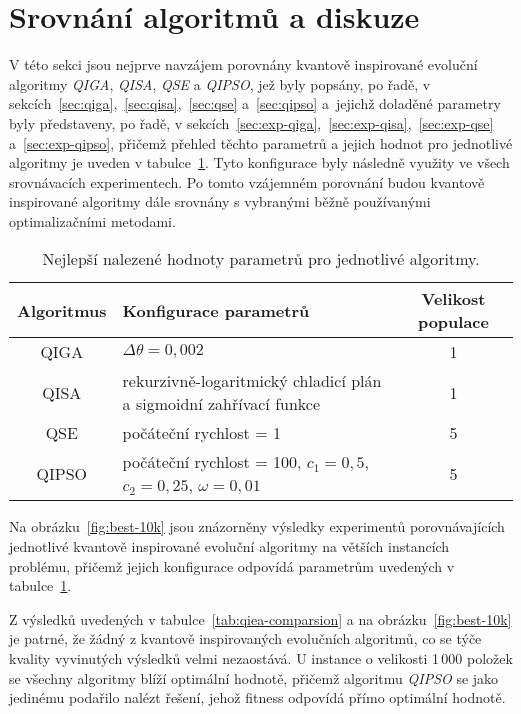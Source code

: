\section{Srovnání algoritmů a diskuze}
V této sekci jsou nejprve navzájem porovnány kvantově inspirované evoluční algoritmy \emph{QIGA}, \emph{QISA}, \emph{QSE} a \emph{QIPSO}, jež byly popsány, po řadě, v sekcích~\ref{sec:qiga},~\ref{sec:qisa},~\ref{sec:qse} a~\ref{sec:qipso} a~jejichž doladěné parametry byly představeny, po řadě, v sekcích~\ref{sec:exp-qiga},~\ref{sec:exp-qisa},~\ref{sec:exp-qse} a~\ref{sec:exp-qipso}, přičemž přehled těchto parametrů a jejich hodnot pro jednotlivé algoritmy je uveden v tabulce~\ref{tab:best-configs}. 
Tyto konfigurace byly následně využity ve všech srovnávacích experimentech. 
Po tomto vzájemném porovnání budou kvantově inspirované algoritmy dále srovnány s vybranými běžně používanými optimalizačními metodami. 

\begin{table}[ht]
    \centering
    \begin{tabularx}{\textwidth}{c X c}
        \toprule
        \textbf{Algoritmus} & \textbf{Konfigurace parametrů} & \textbf{Velikost populace} \\
        \midrule
        QIGA   & $\Delta\theta = 0{,}002$ & 1 \\[1ex]
        QISA   & rekurzivně-logaritmický chladicí plán a sigmoidní zahřívací funkce & 1 \\[1ex]
        QSE    & počáteční rychlost = 1 & 5 \\[1ex]
        QIPSO  & počáteční rychlost = 100, $c_1 = 0{,}5$, $c_2 = 0{,}25$, $\omega = 0{,}01$ & 5 \\
        \bottomrule
    \end{tabularx}
    \caption{Nejlepší nalezené hodnoty parametrů pro jednotlivé algoritmy.}
    \label{tab:best-configs}
\end{table}

Na obrázku~\ref{fig:best-10k} jsou znázorněny výsledky experimentů porovnávajících jednotlivé kvantově inspirované evoluční algoritmy na větších instancích problému, přičemž jejich konfigurace odpovídá parametrům uvedených v tabulce~\ref{tab:best-configs}. 

Z výsledků uvedených v tabulce~\ref{tab:qiea-comparsion} a na obrázku~\ref{fig:best-10k} je patrné, že žádný z kvantově inspirovaných evolučních algoritmů, co se týče kvality vyvinutých výsledků velmi nezaostává. 
U instance o velikosti 1\,000 položek se všechny algoritmy blíží optimální hodnotě, přičemž algoritmu \emph{QIPSO} se jako jedinému podařilo nalézt řešení, jehož fitness odpovídá přímo optimální hodnotě. 

